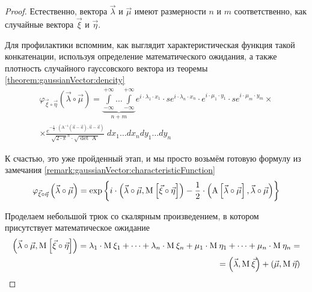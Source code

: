 \begin{proof}
  Естественно, вектора $\vec{\lambda}$ и $\vec{\mu}$ имеют размерности $n$
  и $m$ соответственно, как случайные вектора $\vec{\xi}$ и $\vec{\eta}$.

  Для профилактики вспомним, как выглядит характеристическая функция такой
  конкатенации, используя определение математического ожидания, а также
  плотность случайного гауссовского вектора
  из теоремы \ref{theorem:gaussianVector:dencity}
  \begin{align*}
      \varphi_{\vec{\xi} \circ \vec{\eta}}\left(
      \vec{\lambda} \circ \vec{\mu} \right)
      = \underbrace{\int\limits_{-\infty}^{+ \infty} \dots
          \int\limits_{-\infty}^{+ \infty}}_{n+m}
      e^{i \cdot \lambda_1 \cdot x_1}
          \cdot s e^{i \cdot \lambda_n \cdot x_n}
          \cdot e^{i \cdot \mu_1 \cdot y_1}
          \cdot s e^{i \cdot \mu_m \cdot y_m} \times \\
      \times
      \frac{e^{-\frac{1}{2} \cdot \left(
          \operatorname{A^{-1}} \left( \vec{u} - \vec{a} \right),
          \vec{u} - \vec{a} \right)}}{\sqrt{2 \cdot \pi}^n
        \cdot \sqrt{\det{\operatorname{A}}}}
          \;dx_1 \dots dx_n dy_1 \dots dy_n
  \end{align*}

  К счастью, это уже пройденный этап, и мы просто возьмём готовую формулу из
  замечания \ref{remark:gaussianVector:characteristicFunction}
  \begin{equation}\label{eq:concatinationCFStart}
      \varphi_{\vec{\xi} \circ \vec{\eta}}\left(
      \vec{\lambda} \circ \vec{\mu} \right)
      = \exp{\left\{
          i \cdot \left( \vec{\lambda} \circ \vec{\mu},
        \operatorname{M}_{} \left[ \vec{\xi} \circ \vec{\eta} \right] \right)
          - \frac{1}{2} \cdot \left( \operatorname{A}
        \left[ \vec{\lambda} \circ \vec{\mu} \right],
        \vec{\lambda} \circ \vec{\mu} \right)
      \right\}}
  \end{equation}

  Проделаем небольшой трюк со скалярным произведением, в котором присутствует
  математическое ожидание
  \begin{align*}
      \left( \vec{\lambda} \circ \vec{\mu},
      \operatorname{M}_{} \left[ \vec{\xi} \circ \vec{\eta} \right] \right)
      = \lambda_1 \cdot \operatorname{M}_{} \xi_1 + \dots + \lambda_n \cdot \operatorname{M}_{} \xi_n +
      \mu_1 \cdot \operatorname{M}_{} \eta_1 + \dots + \mu_n \cdot \operatorname{M}_{} \eta_n = \\
      = \left( \vec{\lambda}, \operatorname{M}_{} \vec{\xi} \right)
      + \left( \vec{\mu}, \operatorname{M}_{} \vec{\eta} \right)
  \end{align*}


\end{proof}
